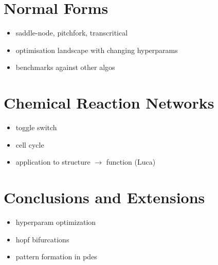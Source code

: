 \documentclass{article}[12pt]
\numberwithin{equation}{section}
\begin{document}
\section{Normal Forms}
\label{sec:normal-forms}

\begin{itemize}
    \item saddle-node, pitchfork, transcritical
    \item optimisation landscape with changing hyperparams
    \item benchmarks against other algos
\end{itemize}


\section{Chemical Reaction Networks}
\label{sec:networks}

\begin{itemize}
    \item toggle switch
    \item cell cycle
    \item application to structure $\rightarrow$ function (Luca)
\end{itemize}

\section{Conclusions and Extensions}
\label{sec:conclusions}

\begin{itemize}
    \item hyperparam optimization
    \item hopf bifurcations
    \item pattern formation in pdes
\end{itemize}



\end{document}
